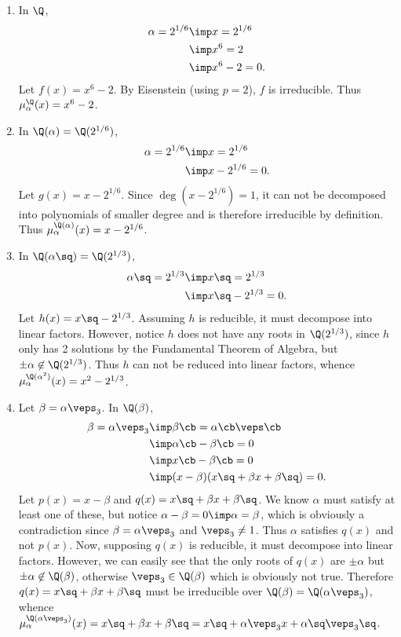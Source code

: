 \documentclass{article}
\begin{document}
\begin{solution}
\begin{enumerate}[label=\alph*)]
\item In \( \Q \), \begin{align*}
  \alpha = 2^{1/6} &\imp x = 2^{1/6}\\
  &\imp x^6 = 2 \\
  &\imp x^6 - 2 = 0.
\end{align*}
Let \( f(x) = x^6-2 \).
By Eisenstein (using \( p=2 \)), \( f \) is irreducible.
Thus \( \mu_\alpha^\Q (x) = x^6 - 2 \).

\item In \( \Q(\alpha)=\Q(2^{1/6}) \), \begin{align*}
  \alpha = 2^{1/6} &\imp x=2^{1/6} \\
  &\imp x - 2^{1/6} = 0.
\end{align*}
Let \( g(x) = x-2^{1/6} \).
Since \( \deg(x-2^{1/6}) = 1 \), it can not be decomposed into  polynomials of smaller degree and is therefore irreducible by definition.
Thus \( \mu_\alpha^{\Q(\alpha)} (x) = x - 2^{1/6} \).

\item In \( \Q(\alpha\sq)=\Q(2^{1/3}) \), \begin{align*}
  \alpha\sq = 2^{1/3} &\imp x\sq = 2^{1/3} \\
  &\imp x\sq - 2^{1/3} = 0.
\end{align*}
Let \( h(x) = x\sq-2^{1/3} \). Assuming \( h \) is reducible, it must decompose into linear factors.
However, notice \( h \) does not have any roots in \( \Q(2^{1/3}) \), since \( h \) only has 2 solutions by the Fundamental Theorem of Algebra, but \( \pm\alpha\not\in \Q(2^{1/3}) \).
Thus \( h \) can not be reduced into linear factors, whence \( \mu_\alpha^{\Q(\alpha^2)}(x) = x^2-2^{1/3} \).

\item Let \( \beta=\alpha\veps_3 \). In \( \Q(\beta) \), \begin{align*}
  \beta = \alpha\veps_3 &\imp \beta\cb = \alpha\cb \veps\cb \\
  &\imp \alpha\cb - \beta\cb = 0 \\
  &\imp x\cb - \beta\cb = 0 \\
  &\imp (x-\beta)(x\sq+\beta x + \beta\sq) = 0.
\end{align*}
Let \( p(x) = x-\beta \) and \( q(x) = x\sq+\beta x + \beta\sq \).
We know \( \alpha \) must satisfy at least one of these, but notice \( \alpha-\beta = 0 \imp \alpha = \beta \), which is obviously a contradiction since \( \beta=\alpha\veps_3 \) and \( \veps_3 \neq 1 \).
Thus \( \alpha \) satisfies \( q(x) \) and not \( p(x) \). Now, supposing \( q(x) \) is reducible, it must decompose into linear factors.
However, we can easily see that the only roots of \( q(x) \) are \( \pm \alpha \) but \( \pm\alpha\not\in \Q(\beta) \), otherwise \( \veps_3 \in \Q(\beta) \) which is obviously not true.
Therefore \( q(x) =  x\sq+\beta x + \beta\sq \) must be irreducible over \( \Q(\beta) = \Q(\alpha\veps_3) \), whence \( \mu_\alpha^{\Q(\alpha\veps_3)}(x) =  x\sq+\beta x + \beta\sq = x\sq+\alpha\veps_3x + \alpha\sq\veps_3\sq \).
\end{enumerate}
\end{solution}
\end{document}
